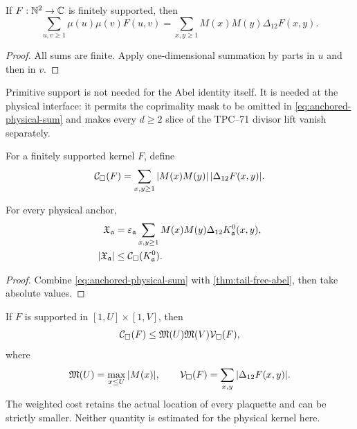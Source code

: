 \begin{theorem}
\label{thm:tail-free-abel}
If \(F:\mathbb N^2\to\mathbb C\) is finitely supported, then
\begin{equation}
 \boxed{
 \sum_{u,v\ge1}\mu(u)\mu(v)F(u,v)
 =
 \sum_{x,y\ge1}M(x)M(y)\Delta_{12}F(x,y).}
 \label{eq:tail-free-abel}
\end{equation}
\end{theorem}

\begin{proof}
All sums are finite.  Apply one-dimensional summation by parts in \(u\)
and then in \(v\).
\end{proof}

\begin{remark}
Primitive support is not needed for the Abel identity itself.  It is
needed at the physical interface: it permits the coprimality mask to be
omitted in \eqref{eq:anchored-physical-sum} and makes every \(d\ge2\)
slice of the TPC--71 divisor lift vanish separately.
\end{remark}

\begin{definition}
\label{def:weighted-plaquette-cost}
For a finitely supported kernel \(F\), define
\begin{equation}
 \mathcal C_\square(F)
 =
 \sum_{x,y\ge1}
 |M(x)M(y)|\,|\Delta_{12}F(x,y)|.
 \label{eq:weighted-plaquette-cost}
\end{equation}
\end{definition}

\begin{corollary}
\label{cor:exact-anchored-certificate}
For every physical anchor,
\begin{align}
 \mathfrak X_{\mathfrak a}
 &=
 \varepsilon_{\mathfrak a}
 \sum_{x,y\ge1}
 M(x)M(y)\Delta_{12}K_{\mathfrak a}^{0}(x,y),
 \label{eq:anchored-Abel-identity}\\
 |\mathfrak X_{\mathfrak a}|
 &\le \mathcal C_\square(K_{\mathfrak a}^{0}).
 \label{eq:anchored-weighted-cost}
\end{align}
\end{corollary}

\begin{proof}
Combine \eqref{eq:anchored-physical-sum} with
\cref{thm:tail-free-abel}, then take absolute values.
\end{proof}

\begin{remark}
\label{rem:weighted-is-sharper}
If \(F\) is supported in \([1,U]\times[1,V]\), then
\[
 \mathcal C_\square(F)
 \le
 \mathfrak M(U)\mathfrak M(V)\mathcal V_\square(F),
\]
where
\[
 \mathfrak M(U)=\max_{x\le U}|M(x)|,
 \qquad
 \mathcal V_\square(F)=\sum_{x,y}|\Delta_{12}F(x,y)|.
\]
The weighted cost retains the actual location of every plaquette and can
be strictly smaller.  Neither quantity is estimated for the physical
kernel here.
\end{remark}

